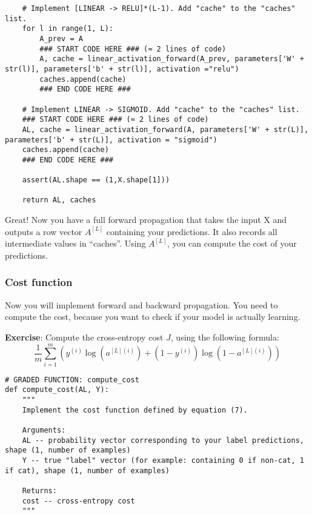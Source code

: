 {\begin{verbatim}
    # Implement [LINEAR -> RELU]*(L-1). Add "cache" to the "caches" list.
    for l in range(1, L):
        A_prev = A 
        ### START CODE HERE ### (≈ 2 lines of code)
        A, cache = linear_activation_forward(A_prev, parameters['W' + str(l)], parameters['b' + str(l)], activation ="relu")
        caches.append(cache)
        ### END CODE HERE ###
    
    # Implement LINEAR -> SIGMOID. Add "cache" to the "caches" list.
    ### START CODE HERE ### (≈ 2 lines of code)
    AL, cache = linear_activation_forward(A, parameters['W' + str(L)], parameters['b' + str(L)], activation = "sigmoid")
    caches.append(cache)
    ### END CODE HERE ###
    
    assert(AL.shape == (1,X.shape[1]))
            
    return AL, caches
\end{verbatim}

Great! Now you have a full forward propagation that takes the input X and outputs a row vector $A^{[L]}$ containing your predictions. It also records all intermediate values in ``caches''. Using $A^{[L]}$, you can compute the cost of your predictions.




\subsubsection{Cost function}

Now you will implement forward and backward propagation. You need to compute the cost, because you want to check if your model is actually learning.

{\textbf {Exercise}}: Compute the cross-entropy cost $J$, using the following formula: 
\begin{equation}
\frac{1}{m} \sum\limits_{i = 1}^{m} (y^{(i)}\log\left(a^{[L] (i)}\right) + (1-y^{(i)})\log\left(1- a^{[L](i)}\right)) 
\end{equation}

\begin{verbatim}
# GRADED FUNCTION: compute_cost
def compute_cost(AL, Y):
    """
    Implement the cost function defined by equation (7).

    Arguments:
    AL -- probability vector corresponding to your label predictions, shape (1, number of examples)
    Y -- true "label" vector (for example: containing 0 if non-cat, 1 if cat), shape (1, number of examples)

    Returns:
    cost -- cross-entropy cost
    """
    

\end{verbatim}}
